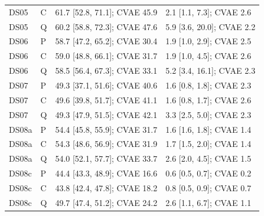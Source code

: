 \documentclass[10pt]{article}
\begin{document}
{\begin{longtable}{llll}
DS05 & C & 61.7 [52.8, 71.1]; CVAE 45.9 & 2.1 [1.1, 7.3]; CVAE 2.6 \\
DS05 & Q & 60.2 [58.8, 72.3]; CVAE 47.6 & 5.9 [3.6, 20.0]; CVAE 2.2 \\
\midrule
DS06 & P & 58.7 [47.2, 65.2]; CVAE 30.4 & 1.9 [1.0, 2.9]; CVAE 2.5 \\
DS06 & C & 59.0 [48.8, 66.1]; CVAE 31.7 & 1.9 [1.0, 4.5]; CVAE 2.6 \\
DS06 & Q & 58.5 [56.4, 67.3]; CVAE 33.1 & 5.2 [3.4, 16.1]; CVAE 2.3 \\
\midrule
DS07 & P & 49.3 [37.1, 51.6]; CVAE 40.6 & 1.6 [0.8, 1.8]; CVAE 2.3 \\
DS07 & C & 49.6 [39.8, 51.7]; CVAE 41.1 & 1.6 [0.8, 1.7]; CVAE 2.6 \\
DS07 & Q & 49.3 [47.9, 51.5]; CVAE 42.1 & 3.3 [2.5, 5.0]; CVAE 2.3 \\
\midrule
DS08a & P & 54.4 [45.8, 55.9]; CVAE 31.7 & 1.6 [1.6, 1.8]; CVAE 1.4 \\
DS08a & C & 54.3 [48.6, 56.9]; CVAE 31.9 & 1.7 [1.5, 2.0]; CVAE 1.4 \\
DS08a & Q & 54.0 [52.1, 57.7]; CVAE 33.7 & 2.6 [2.0, 4.5]; CVAE 1.5 \\
\midrule
DS08c & P & 44.4 [43.3, 48.9]; CVAE 16.6 & 0.6 [0.5, 0.7]; CVAE 0.2 \\
DS08c & C & 43.8 [42.4, 47.8]; CVAE 18.2 & 0.8 [0.5, 0.9]; CVAE 0.7 \\
DS08c & Q & 49.7 [47.4, 51.2]; CVAE 24.2 & 2.6 [1.1, 6.7]; CVAE 1.1 \\
\end{longtable}
\vspace{-0.6em}
}
\end{document}
